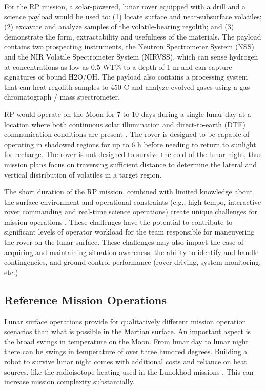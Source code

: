 \documentclass[twocolumn,letterpaper]{IEEEAerospaceCLS}  %
\begin{document}
For the RP mission, a solar-powered, lunar rover equipped with a drill and a science payload would be used to: (1) locate surface and near-subsurface volatiles; (2) excavate and analyze samples of the volatile-bearing regolith; and (3) demonstrate the form, extractability and usefulness of the materials. 
The payload contains two prospecting instruments, the Neutron Spectrometer System (NSS) and the NIR Volatile Spectrometer System (NIRVSS), which can sense hydrogen at concentrations as low as 0.5 WT\% to a depth of 1 m and can capture signatures of bound H2O/OH. 
The payload also contains a processing system that can heat regolith samples to 450 C and analyze evolved gases using a gas chromatograph / mass spectrometer.

RP would operate on the Moon for 7 to 10 days during a single lunar day at a location where both continuous solar illumination and direct-to-earth (DTE) communication conditions are present \cite{trimble2016lunar}. 
The rover is designed to be capable of operating in shadowed regions for up to 6 h before needing to return to sunlight for recharge. 
The rover is not designed to survive the cold of the lunar night, thus mission plans focus on traversing sufficient distance to determine the lateral and vertical distribution of volatiles in a target region.

The short duration of the RP mission, combined with limited knowledge about the surface environment and operational constraints (e.g., high-tempo, interactive rover commanding and real-time science operations) create unique challenges for mission operations \cite{hooey2017modeling}. 
These challenges have the potential to contribute to significant levels of operator workload for the team responsible for maneuvering the rover on the lunar surface. 
These challenges may also impact the ease of acquiring and maintaining situation awareness, the ability to identify and handle contingencies, and ground control performance (rover driving, system monitoring, etc.)

\subsection{Reference Mission Operations}
Lunar surface operations provide for qualitatively different mission operation scenarios than what is possible in the Martian surface.  
An important aspect is the broad swings in temperature on the Moon.  
From lunar day to lunar night there can be swings in temperature of over three hundred degrees.  
Building a robot to survive lunar night comes with additional costs and reliance on heat sources, like the radioisotope heating used in the Lunokhod missions \cite{ulamec2010survive}.  
This can increase mission complexity substantially.  
\end{document}
